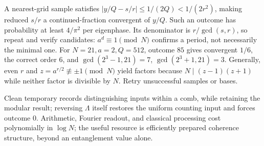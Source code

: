 \documentclass[11pt,a4paper]{article}
\begin{document}
A nearest-grid sample satisfies \(\lvert y/Q-s/r\rvert\le1/(2Q)<1/(2r^2)\), making reduced \(s/r\) a continued-fraction convergent of \(y/Q\). Such an outcome has probability at least \(4/\pi^2\) per eigenphase. Its denominator is \(r/\gcd(s,r)\), so repeat and verify candidates: \(a^d\equiv1\pmod N\) confirms a period, not necessarily the minimal one. For \(N=21,a=2,Q=512\), outcome \(85\) gives convergent \(1/6\), the correct order \(6\), and \(\gcd(2^3-1,21)=7\), \(\gcd(2^3+1,21)=3\). Generally, even \(r\) and \(z=a^{r/2}\not\equiv\pm1\pmod N\) yield factors because \(N\mid(z-1)(z+1)\) while neither factor is divisible by \(N\). Retry unsuccessful samples or bases.

Clean temporary records distinguishing inputs within a comb, while retaining the modular result; reversing \(\Lambda\) itself restores the uniform counting input and forces outcome \(0\). Arithmetic, Fourier readout, and classical processing cost polynomially in \(\log N\); the useful resource is efficiently prepared coherence structure, beyond an entanglement value alone.
\end{document}
